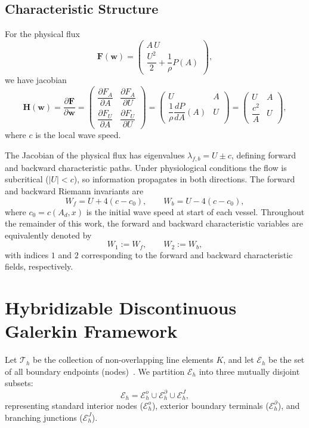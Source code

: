 \documentclass[11pt]{article}
\newcommand{\Th}{\mathcal{T}_h}
\newcommand{\Eh}{\mathcal{E}_h}
\newcommand{\Eho}{\mathcal{E}_h^o}
\newcommand{\Ehb}{\mathcal{E}_h^{\partial}}
\newcommand{\Ehj}{\mathcal{E}_h^{J}}
\begin{document}
\subsection{Characteristic Structure}

For the physical flux
\[
  \mathbf{F}(\mathbf{w}) =
  \begin{pmatrix}
    A\,U \\[1mm]
    \dfrac{U^2}{2} + \dfrac{1}{\rho}P(A)
  \end{pmatrix},
\]
we have jacobian
\[
  \mathbf{H}(\mathbf{w})
  = \frac{\partial\mathbf{F}}{\partial\mathbf{w}}
  =
  \begin{pmatrix}
    \dfrac{\partial F_A}{\partial A} &
    \dfrac{\partial F_A}{\partial U} \\[2mm]
    \dfrac{\partial F_U}{\partial A} &
    \dfrac{\partial F_U}{\partial U}
  \end{pmatrix}
  =
  \begin{pmatrix}
    U & A \\[2mm]
    \dfrac{1}{\rho}\dfrac{dP}{dA}(A) & U
  \end{pmatrix}
  =
  \begin{pmatrix}
    U & A \\[2mm]
    \dfrac{c^2}{A} & U
  \end{pmatrix},
\]
where $c$ is the local wave speed.

The Jacobian of the physical flux  has eigenvalues
$\lambda_{f,b} = U \pm c$, defining forward and backward
characteristic paths.
Under physiological conditions the flow is subcritical
($|U| < c$), so information propagates in both directions.
The forward and backward Riemann invariants are
\begin{equation}
  W_f = U + 4(c - c_0),
  \qquad
  W_b = U - 4(c - c_0),
  \label{eq:riemann_inv}
\end{equation}
where $c_0 = c(A_d, x)$ is the initial wave speed at start of each vessel. Throughout the remainder of this work, the forward and backward characteristic variables are equivalently denoted by
\[
W_1 := W_f,
\qquad
W_2 := W_b,
\]
with indices $1$ and $2$ corresponding to the forward and backward characteristic fields, respectively.
\section{Hybridizable Discontinuous Galerkin Framework}
Let $\Th$ be the collection of non-overlapping line elements $K$, and let $\Eh$ be the set of all boundary endpoints (nodes)~\cite{peraire2010hybridizable}. We partition $\Eh$ into three mutually disjoint subsets:
\[
  \Eh = \Eho \cup \Ehb \cup \Ehj,
\]
representing standard interior nodes ($\Eho$), exterior boundary terminals ($\Ehb$), and branching junctions ($\Ehj$). 
\end{document}
